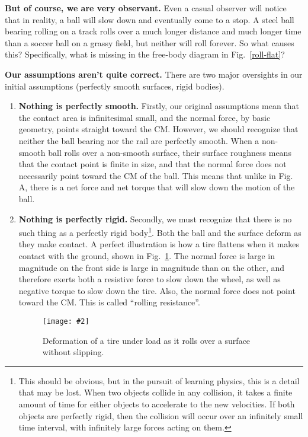 \documentclass[11pt]{article}
\newcommand{\pic}[2]{\texttt{[image: \#2]}}
\begin{document}
\textbf{But of course, we are very observant.} Even a casual observer will
notice that in reality, a ball will slow down and eventually come to a stop. A
steel ball bearing rolling on a track rolls over a much longer distance and
much longer time than a soccer ball on a grassy field, but neither will roll
forever. So what causes this? Specifically, what is missing in the free-body
diagram in Fig.~\ref{roll-flat}?

\textbf{Our assumptions aren't quite correct.} There are two major oversights
in our initial assumptions (perfectly smooth surfaces, rigid bodies).
\begin{enumerate}
\item\textbf{Nothing is perfectly smooth.} Firstly, our original assumptions
  mean that the contact area is infinitesimal small, and the normal force, by
  basic geometry, points straight toward the CM. However, we should recognize
  that neither the ball bearing nor the rail are perfectly smooth. When a
  non-smooth ball rolls over a non-smooth surface, their surface roughness
  means that the contact point is finite in size, and that the normal force
  does not necessarily point toward the CM of the ball. This means that unlike
  in Fig. A, there is a net force and net torque that will slow down the motion
  of the ball.
\item\textbf{Nothing is perfectly rigid.} Secondly, we must recognize that
  there is no such thing as a perfectly rigid body\footnote{This should be
    obvious, but in the pursuit of learning physics, this is a detail that may
    be lost. When two objects collide in any collision, it takes a finite
    amount of time for either objects to accelerate to the new velocities. If
    both objects are perfectly rigid, then the collision will occur over an
    infinitely small time interval, with infinitely large forces acting on
    them.}. Both the ball and the surface deform as they make contact. A
  perfect illustration is how a tire flattens when it makes contact with the
  ground, shown in Fig.~\ref{tire1}. The normal force is large in magnitude on
  the front side is large in magnitude than on the other, and therefore exerts
  both a resistive force to slow down the wheel, as well as negative torque to
  slow down the tire. Also, the normal force does not point toward the CM. This
  is called ``rolling resistance''.
  \begin{figure}[!ht]
    \centering
    \pic{.45}{OAGZy.png}
    \caption{Deformation of a tire under load as it rolls over a surface
      without slipping.}
     \label{tire1}
  \end{figure}
\end{enumerate}
\end{document}
